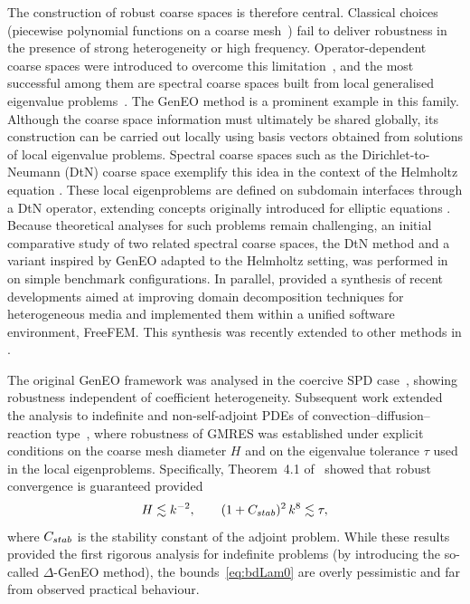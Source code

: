 \documentclass[preprint,3p,times]{elsarticle}
\newcommand{\Cstab}{C_{\textup{\textsf{stab}}}}
\theoremstyle{definition}
\numberwithin{equation}{section}
\begin{document}
The construction of robust coarse spaces is therefore central. Classical choices (piecewise polynomial functions on a coarse mesh~\cite{Cai:1999:RAS,Toselli:2005:DDM}) fail to deliver robustness in the presence of strong heterogeneity or high frequency. Operator-dependent coarse spaces were introduced to overcome this limitation~\cite{Graham:2007:DDM}, and the most successful among them are spectral coarse spaces built from local generalised eigenvalue problems~\cite{Spillane:2014:ARC}. The GenEO method is a prominent example in this family. Although the coarse space information must ultimately be shared globally, its construction can be carried out locally using basis vectors obtained from solutions of local eigenvalue problems. Spectral coarse spaces such as the Dirichlet-to-Neumann (DtN) coarse space exemplify this idea in the context of the Helmholtz equation \cite{Conen:2014:ACS}. These local eigenproblems are defined on subdomain interfaces through a DtN operator, extending concepts originally introduced for elliptic equations \cite{Nataf:2011:ACS, Dolean:2012:ATL}. Because theoretical analyses for such problems remain challenging, an initial comparative study of two related spectral coarse spaces, the DtN method and a variant inspired by GenEO adapted to the Helmholtz setting, was performed in \cite{Bootland:2022:CDG} on simple benchmark configurations. In parallel, \cite{Bootland:2021:ACS} provided a synthesis of recent developments aimed at improving domain decomposition techniques for heterogeneous media and implemented them within a unified software environment, FreeFEM. This synthesis was recently extended to other methods in \cite{dolean:2025:RHO}.

The original GenEO framework was analysed in the coercive SPD case~\cite{Spillane:2014:ARC}, 
showing robustness independent of coefficient heterogeneity. 
Subsequent work extended the analysis to indefinite and non-self-adjoint PDEs of convection--diffusion--reaction type~\cite{Bootland:2022:OSM}, 
where robustness of GMRES was established under explicit conditions on the coarse mesh diameter $H$ and on the 
eigenvalue tolerance $\tau$ used in the local eigenproblems. 
Specifically, Theorem~4.1 of~\cite{Bootland:2022:OSM} showed that robust convergence is guaranteed provided
\begin{equation}\label{eq:bdLam0}
   H \lesssim k^{-2}, 
   \qquad 
   (1+\Cstab)^2 \, k^8 \lesssim \tau,
\end{equation}
where $\Cstab$ is the stability constant of the adjoint problem. While these results provided the first rigorous analysis for indefinite problems (by introducing the so-called $\Delta$-GenEO method), the bounds~\eqref{eq:bdLam0} are overly pessimistic and far from observed practical behaviour.
\end{document}
